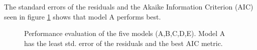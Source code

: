 \documentclass[a4paper,10pt]{article}
\begin{document}
The standard errors of the residuals and the Akaike Information Criterion (AIC) seen in figure \ref{fig:modperf} shows that model A performs best.
\begin{figure}[ht]
\centering
  \qquad
  \caption{Performance evaluation of the five models (A,B,C,D,E). Model A has the least std. error of the residuals and the best AIC metric.}
\label{fig:modperf}
\end{figure}
\end{document}
